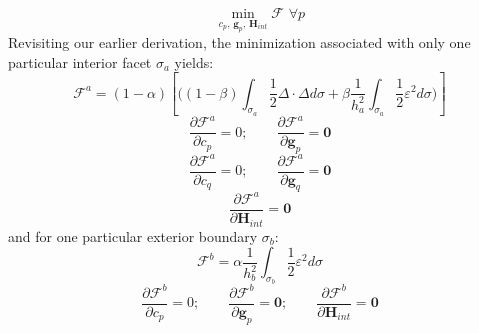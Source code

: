 \documentclass[11pt]{article} %
\begin{document}
\begin{equation}
	\min_{c_p, \, \mathbf{g}_p, \, \mathbf{H}_{int}} \mathcal{F} \, \, \forall p
\end{equation}
Revisiting our earlier derivation, the minimization associated with only one particular interior facet $\sigma_a$ yields:
\begin{equation}
	\mathcal{F}^a = (1-\alpha) \left[ \bigg( (1-\beta) \int_{\sigma_a} \frac{1}{2} \Delta \cdot \Delta d \sigma + \beta \frac{1}{h_a^2} \int_{\sigma_a} \frac{1}{2} \varepsilon^2 d \sigma \bigg) \right]
\end{equation}
\begin{equation}
	\frac{\partial \mathcal{F}^a}{\partial c_p} = 0; \qquad \frac{\partial \mathcal{F}^a}{\partial \mathbf{g}_p} = \mathbf{0}
\end{equation}
\begin{equation}
	\frac{\partial \mathcal{F}^a}{\partial c_q} = 0; \qquad \frac{\partial \mathcal{F}^a}{\partial \mathbf{g}_q} = \mathbf{0}
\end{equation}
\begin{equation}
	\frac{\partial \mathcal{F}^a}{\partial \mathbf{H}_{int}} = \mathbf{0}
\end{equation}
and for one particular exterior boundary $\sigma_b$:
\begin{equation}
	\mathcal{F}^b = \alpha \frac{1}{h_b^2} \int_{\sigma_b} \frac{1}{2} \varepsilon^2 d \sigma
\end{equation}
\begin{equation}
	\frac{\partial \mathcal{F}^b}{\partial c_p} = 0; \qquad \frac{\partial \mathcal{F}^b}{\partial \mathbf{g}_p} = \mathbf{0}; \qquad \frac{\partial \mathcal{F}^b}{\partial \mathbf{H}_{int}} = \mathbf{0}
\end{equation}
\end{document}
